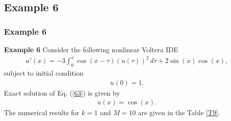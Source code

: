 \documentclass{beamer}
\begin{document}
\subsection*{Example 6}
\begin{frame}\frametitle{Example 6}
	\justifying
\textbf{Example 6} Consider the following nonlinear Voltera IDE \cite{imran2}
\begin{eqnarray}\label{63}
u'(x)=-3\int^x_0\cos(x-\tau)(u(\tau))^{2}\,d\tau+2\sin(x)\cos(x),
\end{eqnarray}
\small
subject to initial condition
\begin{eqnarray}\label{64}
u(0)=1.
\end{eqnarray}
\small
Exact solution of Eq. (\ref{63}) is given by \cite{imran2}
\begin{eqnarray}\label{65}
u(x)=\cos(x).
\end{eqnarray}
\small
The numerical results for $k=1$ and $M=10$ are given in the Table \ref{T9}.
\end{frame}
\end{document}

